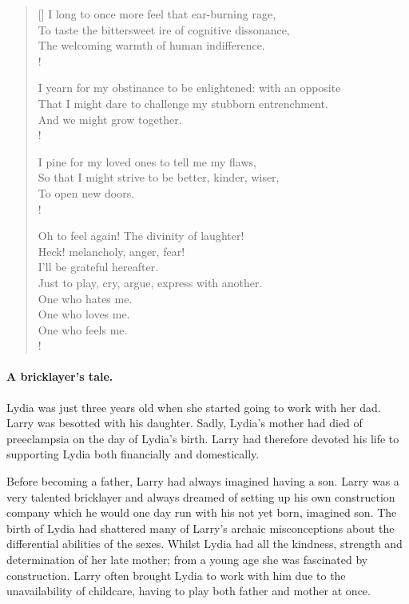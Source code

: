 \begin{verse}[\versewidth]
I long to once more feel that ear-burning rage,\\
To taste the bittersweet ire of cognitive dissonance,\\
The welcoming warmth of human indifference.\\!

I yearn for my obstinance to be enlightened: with an opposite\\
That I might dare to challenge my stubborn entrenchment.\\
And we might grow together.\\!

I pine for my loved ones to tell me my flaws,\\
So that I might strive to be better, kinder, wiser,\\ 
To open new doors.\\!

Oh to feel again! The divinity of laughter!\\
Heck! melancholy, anger, fear!\\
I'll be grateful hereafter.\\
Just to play, cry, argue, express with another.\\
One who hates me.\\
One who loves me.\\
One who feels me.\\!

\end{verse}

\fugue

\paragraph{A bricklayer's tale.}\strut

Lydia was just three years old when she started going to work with her
dad. Larry was besotted with his daughter. Sadly, Lydia's mother had
died of preeclampsia on the day of Lydia's birth. Larry had therefore
devoted his life to supporting Lydia both financially and
domestically.

Before becoming a father, Larry had always imagined having a
son. Larry was a very talented bricklayer and always dreamed of
setting up his own construction company which he would one day run
with his not yet born, imagined son. The birth of Lydia had shattered
many of Larry's archaic misconceptions about the differential
abilities of the sexes. Whilst Lydia had all the kindness, strength
and determination of her late mother; from a young age she was
fascinated by construction. Larry often brought Lydia to work with him
due to the unavailability of childcare, having to play both father and
mother at once.

